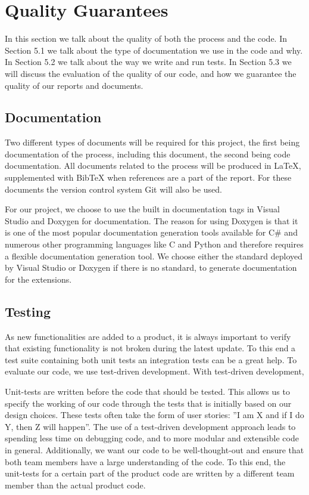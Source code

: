 \section{Quality Guarantees}
In this section we talk about the quality of both the process and the code. In Section 5.1 we talk about the type of documentation we use in the code and why. In Section 5.2 we talk about the way we write and run tests. In Section 5.3 we will discuss the evaluation of the quality of our code, and how we guarantee the quality of our reports and documents.

\subsection{Documentation}
Two different types of documents will be required for this project, the ﬁrst being documentation of the process, including this document, the second being code documentation. All documents related to the process will be produced in LaTeX, supplemented with BibTeX when references are a part of the report. For these documents the version control system Git will also be used.

For our project, we choose to use the built in documentation tags in Visual Studio and Doxygen for documentation. The reason for using Doxygen is that it is one of the most popular documentation generation tools available for C\# and numerous other programming languages like C and Python and therefore requires a flexible documentation generation tool. We choose either the standard deployed by Visual Studio or Doxygen if there is no standard, to generate documentation for the extensions.
\subsection{Testing}
As new functionalities are added to a product, it is always important to verify that existing functionality is not broken during the latest update. To this end a test suite containing both unit tests an integration tests can be a great help. To evaluate our code, we use test-driven development. With test-driven development,

Unit-tests are written before the code that should be tested. This allows us to specify the working of our code through the tests that is initially based on our design choices. These tests often take the form of user stories: ”I am X and if I do Y, then Z will happen”. The use of a test-driven development approach leads to spending less time on debugging code, and to more modular and extensible code in general. Additionally, we want our code to be well-thought-out and ensure that both team members have a large understanding of the code. To this end, the unit-tests for a certain part of the product code are written by a different team member than the actual product code.

